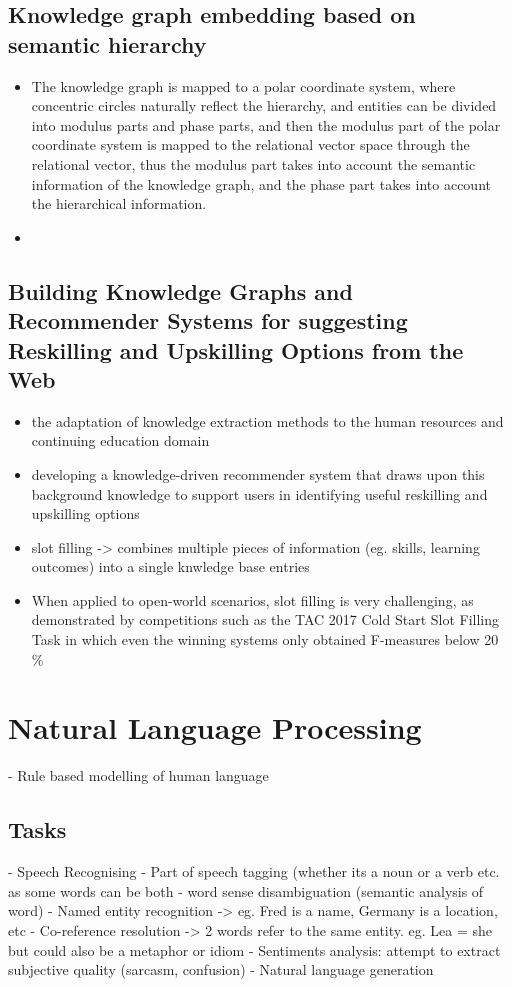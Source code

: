 \documentclass{report}
\begin{document}
\section{Knowledge graph embedding based on semantic hierarchy}
\begin{itemize}
    \item The knowledge graph is mapped to a polar coordinate system, where concentric circles naturally reflect the hierarchy, and entities can be divided into modulus parts and phase parts, and then the modulus part of the polar coordinate system is mapped to the relational vector space through the relational vector, thus the modulus part takes into account the semantic information of the knowledge graph, and the phase part takes into account the hierarchical information.
    \item 
\end{itemize}

\section{Building Knowledge Graphs and Recommender Systems for suggesting Reskilling and Upskilling Options from the Web}
\begin{itemize}
    \item the adaptation of knowledge extraction methods to the human resources and continuing education domain
    \item developing a knowledge-driven recommender system that draws upon this background knowledge to support users in identifying useful reskilling and upskilling options
    \item slot filling -> combines multiple pieces of information (eg. skills, learning outcomes) into a single knwledge base entries
    \item When applied to open-world scenarios, slot
    filling is very challenging, as demonstrated by competitions such as the TAC 2017 Cold Start Slot Filling Task in which even the winning systems only obtained F-measures below 20 \% 
\end{itemize}

\chapter{Natural Language Processing}
- Rule based modelling of human language
\section{Tasks}
- Speech Recognising
- Part of speech tagging (whether its a noun or a verb etc. as some words can be both
- word sense disambiguation (semantic analysis of word)
- Named entity recognition -> eg. Fred is a name, Germany is a location, etc
- Co-reference resolution -> 2 words refer to the same entity. eg. Lea = she but could also be a metaphor or idiom
- Sentiments analysis: attempt to extract subjective quality (sarcasm, confusion)
- Natural language generation
\end{document}
